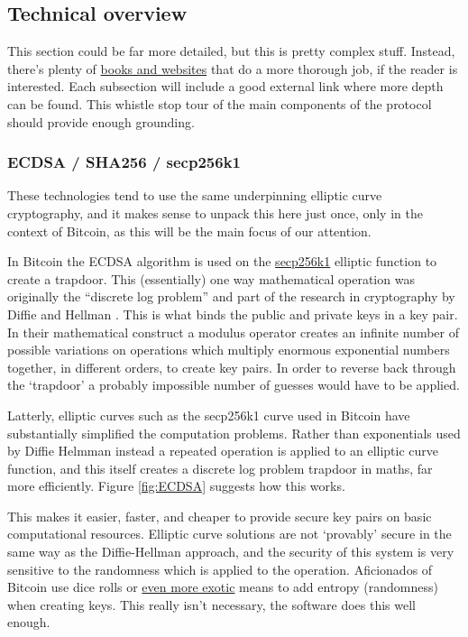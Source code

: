 \subsection{Technical overview}
This section could be far more detailed, but this is pretty complex stuff. Instead, there's plenty of \href{https://github.com/bitcoinbook/bitcoinbook}{books and websites} that do a more thorough job, if the reader is interested. Each subsection will include a good external link where more depth can be found. This whistle stop tour of the main components of the protocol should provide enough grounding.\par
\subsubsection{ECDSA / SHA256 / secp256k1}
These technologies tend to use the same underpinning elliptic curve cryptography, and it makes sense to unpack this here just once, only in the context of Bitcoin, as this will be the main focus of our attention.\par
In Bitcoin the ECDSA algorithm is used on the \href{https://en.bitcoin.it/wiki/Secp256k1}{secp256k1} elliptic function to create a trapdoor. This (essentially) one way mathematical operation was originally the ``discrete log problem'' and part of the research in cryptography by Diffie and Hellman \cite{diffie1976new}. This is what binds the public and private keys in a key pair. In their mathematical construct a modulus operator creates an infinite number of possible variations on operations which multiply enormous exponential numbers together, in different orders, to create key pairs. In order to reverse back through the `trapdoor' a probably impossible number of guesses would have to be applied.\par
Latterly, elliptic curves such as the secp256k1 curve used in Bitcoin have substantially simplified the computation problems. Rather than exponentials used by Diffie Helmman instead a repeated operation is applied to an elliptic curve function, and this itself creates a discrete log problem trapdoor in maths, far more efficiently. Figure \ref{fig:ECDSA} suggests how this works. \par
This makes it easier, faster, and cheaper to provide secure key pairs on basic computational resources. Elliptic curve solutions are not `provably' secure in the same way as the Diffie-Hellman approach, and the security of this system is very sensitive to the randomness which is applied to the operation. Aficionados of Bitcoin use dice rolls or \href{https://www.hackster.io/news/alex-waltz-s-quantum-random-number-generator-for-bitcoin-uses-radioactive-decay-and-a-raspberry-pi-25a75316220f}{even more exotic} means to add entropy (randomness) when creating keys. This really isn't necessary, the software does this well enough.\par  
